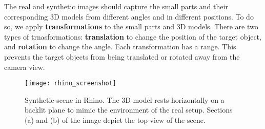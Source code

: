The real and synthetic images should capture the small parts and their corresponding 3D models from different angles and in different positions. To do so, we apply \textbf{transformations} to the small parts and 3D models. There are two types of trnasformations: \textbf{translation} to change the position of the target object, and \textbf{rotation} to change the angle. Each transformation has a range. This prevents the target objects from being translated or rotated away from the camera view.

\begin{figure}[h]
\centering
  \texttt{[image: rhino\_screenshot]}
\caption{Synthetic scene in Rhino. The 3D model rests horizontally on a backlit plane to mimic the environment of the real setup. Sections (a) and (b) of the image depict the top view of the scene.}
\label{fig:synthetic_scene}
\end{figure}
